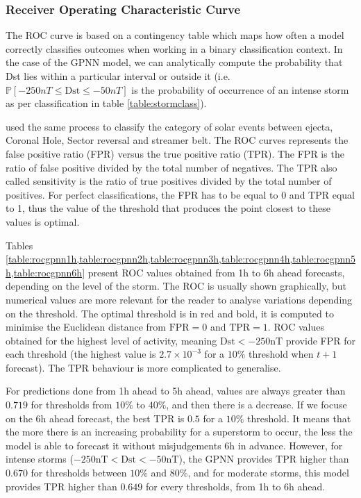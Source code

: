 \subsubsection{Receiver Operating Characteristic Curve}

The ROC curve is based on a contingency table which maps how often a model correctly classifies outcomes when 
working in a binary classification context. In the case of the GPNN model, we can analytically compute the 
probability that Dst lies within a particular interval or outside it (i.e. 
$\mathbb{P}[-250 nT \leq \text{Dst} \leq -50 nT]$ is the probability of occurrence of an intense storm 
as per classification in table \ref{table:stormclass}). 


\citet{camporeale2017classification} used the same process to classify the category of solar events between 
ejecta, Coronal Hole, Sector reversal and streamer belt. The ROC curves represents the false positive ratio (FPR) 
versus the true positive ratio (TPR). The FPR is the ratio of false positive divided by the total number of negatives. The TPR also called sensitivity is the ratio of true positives divided by the total number of positives. For perfect 
classifications, the FPR has to be equal to 0 and TPR equal to 1, thus the value of the threshold that produces 
the point closest to these values is optimal. 


Tables \cref{table:rocgpnn1h,table:rocgpnn2h,table:rocgpnn3h,table:rocgpnn4h,table:rocgpnn5h,table:rocgpnn6h} 
present ROC values obtained from 1h to 6h ahead forecasts, depending on the level of the storm. 
The ROC is usually shown graphically, but numerical values are more relevant for the reader to analyse 
variations depending on the threshold. The optimal threshold is in red and bold, it is computed to 
minimise the Euclidean distance from $\text{FPR} = 0$ and $\text{TPR} = 1$. ROC values obtained for the 
highest level of activity, meaning $\text{Dst} < -250 \text{nT}$ provide FPR for each threshold (the highest 
value is $2.7\times10^{-3}$ for a $10\%$ threshold when $t+1$ forecast). The TPR behaviour is more 
complicated to generalise. 

For predictions done from 1h ahead to 5h ahead, values are always greater than $0.719$ for thresholds from 
$10\%$  to $40\%$, and then there is a decrease. If we focuse on the 6h ahead forecast, the best TPR is $0.5$ 
for a $10\%$ threshold. It means that the more there is an increasing probability for a superstorm to occur, 
the less the model is able to forecast it without misjudgements 6h in advance. However, for intense storms 
($-250 \text{nT} < \text{Dst} < -50 \text{nT}$), the GPNN provides TPR higher than $0.670$ for thresholds 
between $10\%$ and $80\%$, and for moderate storms, this model provides TPR higher than $0.649$ for every 
thresholds, from 1h to 6h ahead. 


